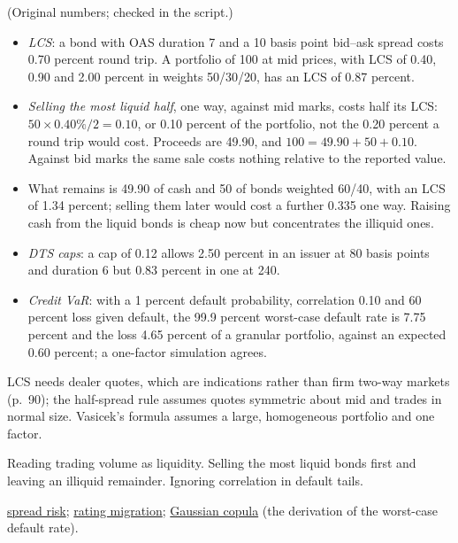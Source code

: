 \begin{qfmethod}
 (Original numbers; checked in the script.)
\begin{itemize}
\item \emph{LCS}: a bond with OAS duration 7 and a 10 basis point bid--ask spread costs 0.70 percent round trip. A portfolio of 100 at mid prices, with LCS of 0.40, 0.90 and 2.00 percent in weights 50/30/20, has an LCS of 0.87 percent.
\item \emph{Selling the most liquid half}, one way, against mid marks, costs half its LCS: $50\times0.40\%/2=0.10$, or 0.10 percent of the portfolio, not the 0.20 percent a round trip would cost. Proceeds are 49.90, and $100=49.90+50+0.10$. Against bid marks the same sale costs nothing relative to the reported value.
\item What remains is 49.90 of cash and 50 of bonds weighted 60/40, with an LCS of 1.34 percent; selling them later would cost a further 0.335 one way. Raising cash from the liquid bonds is cheap now but concentrates the illiquid ones.
\item \emph{DTS caps}: a cap of 0.12 allows 2.50 percent in an issuer at 80 basis points and duration 6 but 0.83 percent in one at 240.
\item \emph{Credit VaR}: with a 1 percent default probability, correlation 0.10 and 60 percent loss given default, the 99.9 percent worst-case default rate is 7.75 percent and the loss 4.65 percent of a granular portfolio, against an expected 0.60 percent; a one-factor simulation agrees.
\end{itemize}

 LCS needs dealer quotes, which are indications rather than firm two-way markets (p.~90); the half-spread rule assumes quotes symmetric about mid and trades in normal size. Vasicek's formula assumes a large, homogeneous portfolio and one factor.

 Reading trading volume as liquidity. Selling the most liquid bonds first and leaving an illiquid remainder. Ignoring correlation in default tails.

 \hyperref[meth:credit-spread-portfolio-risk]{spread risk}; \hyperref[meth:rating-migration-returns]{rating migration}; \hyperref[mod:gaussian-copula-default-correlation]{Gaussian copula} (the derivation of the worst-case default rate).

\end{qfmethod}

